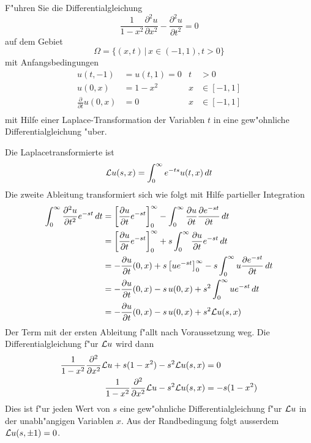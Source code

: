 F"uhren Sie die Differentialgleichung
\[
\frac1{1-x^2}\frac{\partial^2 u}{\partial x^2}
-
\frac{\partial^2 u}{\partial t^2}=0
\]
auf dem Gebiet
\[
\Omega=\{(x,t)\,|\, x\in (-1,1), t>0\}
\]
mit Anfangsbedingungen
\begin{align*}
u(t,-1)&=u(t,1)=0&t&>0\\
u(0,x)&=1-x^2&x&\in[-1,1]\\
\frac{\partial}{\partial t}u(0,x)&=0&x&\in[-1,1]\\
\end{align*}
mit Hilfe einer Laplace-Transformation der Variablen $t$ in eine
gew"ohnliche Differentialgleichung "uber.

\begin{loesung}
Die Laplacetransformierte ist
\[
{\cal L}u(s,x)=\int_0^{\infty}e^{-ts}u(t,x)\,dt
\]
Die zweite Ableitung transformiert sich wie folgt mit Hilfe
partieller Integration
\begin{align*}
\int_0^\infty \frac{\partial^2u}{\partial t^2}e^{-st}\,dt
&=
\left[
\frac{\partial u}{\partial t}e^{-st}
\right]_0^\infty
-\int_0^\infty
\frac{\partial u}{\partial t}\frac{\partial e^{-st}}{\partial t}
\,dt
\\
&=
\left[
\frac{\partial u}{\partial t}e^{-st}
\right]_0^\infty
+s\int_0^\infty
\frac{\partial u}{\partial t}e^{-st}
\,dt
\\
&=
-\frac{\partial u}{\partial t}(0,x)
+s\left[
ue^{-st}
\right]_0^\infty
-s\int_0^\infty u\frac{\partial e^{-st}}{\partial t}\,dt
\\
&=
-\frac{\partial u}{\partial t}(0,x)
-s\,
u(0,x)
+s^2\int_0^\infty u e^{-st}\,dt
\\
&=
-\frac{\partial u}{\partial t}(0,x)
-s\,u(0,x)+s^2{\cal L}u(s,x)
\end{align*}
Der Term mit der ersten Ableitung f"allt nach Voraussetzung weg.
Die Differentialgleichung f"ur ${\cal L}u$ wird dann
\begin{align*}
\frac1{1-x^2}\frac{\partial^2}{\partial x^2}{\cal L}u
+s(1-x^2)-s^2{\cal L}u(s,x)
&=0
\\
\frac1{1-x^2}\frac{\partial^2}{\partial x^2}{\cal L}u
-s^2{\cal L}u(s,x)
&=-s(1-x^2)
\end{align*}
Dies ist f"ur jeden Wert von $s$ eine gew"ohnliche Differentialgleichung
f"ur ${\cal L}u$ in der unabh"angigen Variablen $x$.
Aus der Randbedingung folgt ausserdem ${\cal L}u(s,\pm 1)=0$.
\end{loesung}
